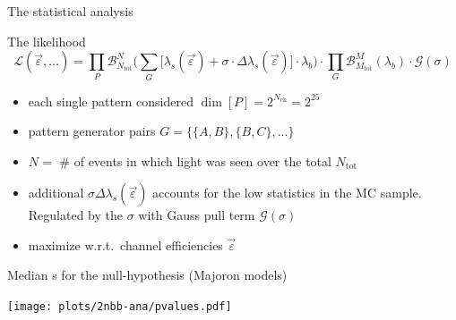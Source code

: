 \documentclass[10pt,aspectratio=169]{beamer}
\renewcommand{\epsilon}{\varepsilon}
\begin{document}
\begin{frame}{The statistical analysis}
  \begin{exampleblock}{The likelihood}
  \[
    \mathcal{L}(\vec{\epsilon}, \ldots) =
      \prod_P \mathcal{B}_{N_\text{tot}}^N \Big(
        \sum_G \big[ \lambda_s(\vec{\epsilon}) + \sigma \cdot
        \Delta\lambda_s(\vec{\epsilon})\big] \cdot \lambda_b
      \Big)
      \cdot \prod_G \mathcal{B}_{M_\text{tot}}^M (\lambda_b) \cdot
      \mathcal{G}(\sigma)
  \]
  \end{exampleblock}
  \begin{itemize}
    \item each single pattern considered $\dim{[P]} = 2^{N_\text{ch}} = 2^{25}$
    \item pattern generator pairs $G = \{\{A,B\},\{B,C\},\ldots\}$
    \item $N = $ \# of events in which light was seen over the total $N_\text{tot}$
    \item additional $\sigma \Delta\lambda_s(\vec{\epsilon})$ accounts for the low statistics in the MC sample. Regulated by the $\sigma$ with Gauss pull term $\mathcal{G}(\sigma)$
    \item maximize w.r.t.~channel efficiencies $\vec{\epsilon}$
  \end{itemize}
\end{frame}
\begin{frame}{Median \pvalue{}s for the null-hypothesis (Majoron models)}
  \begin{center}
    \texttt{[image: plots/2nbb-ana/pvalues.pdf]}
  \end{center}
\end{frame}
\end{document}
